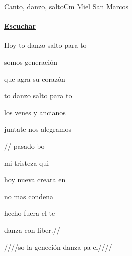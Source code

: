 \documentclass[12pt, spanish]{book}
\newcommand{\NotCCLIed}{\relax}
\begin{document}
    \begin{song}{Canto, danzo, salto}{Cm}
    {} %
    {Miel San Marcos}
    {} %
    {} %
        \ifChordBk
        \paragraph{\mbox{}\hfill\protect\href{https://open.spotify.com/intl-es/track/5FXALCzOPuLhX07GRnrooO}{Escuchar}\mbox{}\hfill}
        \fi


        \begin{SBChorus}
            Hoy  to danzo salto para  to

            somos    generación

            que agra su corazón

            to danzo salto para  to

            los  venes y ancianos

            juntate nos alegramos
        \end{SBChorus}

        \begin{SBOpGroup}
            //  pasado bo

            mi tristeza qui

            hoy nueva creara    en 

            no mas condena

            hecho fuera el te

            danza  con liber.//~
        \end{SBOpGroup}


        \begin{SBOpGroup}
            ////so  la geneción    danza pa  el////~~~~
        \end{SBOpGroup}


\end{song}
\end{document}
